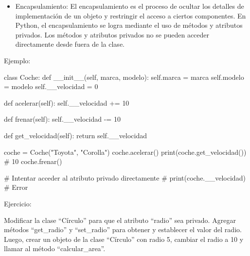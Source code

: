 \documentclass[
  a4paper,
  DIV=11,
  numbers=noendperiod,
  onepage,
  openany]{scrreprt}
\newenvironment{Shaded}{\begin{snugshade}}{\end{snugshade}}
\newcommand{\BuiltInTok}[1]{\textcolor[rgb]{0.00,0.23,0.31}{#1}}
\newcommand{\CommentTok}[1]{\textcolor[rgb]{0.37,0.37,0.37}{#1}}
\newcommand{\ControlFlowTok}[1]{\textcolor[rgb]{0.00,0.23,0.31}{#1}}
\newcommand{\DecValTok}[1]{\textcolor[rgb]{0.68,0.00,0.00}{#1}}
\newcommand{\FunctionTok}[1]{\textcolor[rgb]{0.28,0.35,0.67}{#1}}
\newcommand{\KeywordTok}[1]{\textcolor[rgb]{0.00,0.23,0.31}{#1}}
\newcommand{\NormalTok}[1]{\textcolor[rgb]{0.00,0.23,0.31}{#1}}
\newcommand{\OperatorTok}[1]{\textcolor[rgb]{0.37,0.37,0.37}{#1}}
\newcommand{\StringTok}[1]{\textcolor[rgb]{0.13,0.47,0.30}{#1}}
\newcommand{\VariableTok}[1]{\textcolor[rgb]{0.07,0.07,0.07}{#1}}
\providecommand{\tightlist}{%
  \setlength{\itemsep}{0pt}\setlength{\parskip}{0pt}}\usepackage{longtable,booktabs,array}
\begin{document}
\begin{itemize}
\tightlist
\item
  Encapsulamiento: El encapsulamiento es el proceso de ocultar los
  detalles de implementación de un objeto y restringir el acceso a
  ciertos componentes. En Python, el encapsulamiento se logra mediante
  el uso de métodos y atributos privados. Los métodos y atributos
  privados no se pueden acceder directamente desde fuera de la clase.
\end{itemize}

Ejemplo:

\begin{Shaded}
\begin{Highlighting}[]
\KeywordTok{class}\NormalTok{ Coche:}
    \KeywordTok{def} \FunctionTok{\_\_init\_\_}\NormalTok{(}\VariableTok{self}\NormalTok{, marca, modelo):}
        \VariableTok{self}\NormalTok{.marca }\OperatorTok{=}\NormalTok{ marca}
        \VariableTok{self}\NormalTok{.modelo }\OperatorTok{=}\NormalTok{ modelo}
        \VariableTok{self}\NormalTok{.\_\_velocidad }\OperatorTok{=} \DecValTok{0}

    \KeywordTok{def}\NormalTok{ acelerar(}\VariableTok{self}\NormalTok{):}
        \VariableTok{self}\NormalTok{.\_\_velocidad }\OperatorTok{+=} \DecValTok{10}

    \KeywordTok{def}\NormalTok{ frenar(}\VariableTok{self}\NormalTok{):}
        \VariableTok{self}\NormalTok{.\_\_velocidad }\OperatorTok{{-}=} \DecValTok{10}

    \KeywordTok{def}\NormalTok{ get\_velocidad(}\VariableTok{self}\NormalTok{):}
        \ControlFlowTok{return} \VariableTok{self}\NormalTok{.\_\_velocidad}

\NormalTok{coche }\OperatorTok{=}\NormalTok{ Coche(}\StringTok{"Toyota"}\NormalTok{, }\StringTok{"Corolla"}\NormalTok{)}
\NormalTok{coche.acelerar()}
\BuiltInTok{print}\NormalTok{(coche.get\_velocidad())  }\CommentTok{\# 10}
\NormalTok{coche.frenar()}

\CommentTok{\# Intentar acceder al atributo privado directamente}
\CommentTok{\# print(coche.\_\_velocidad)  \# Error}
\end{Highlighting}
\end{Shaded}

Ejercicio:

Modificar la clase ``Círculo'' para que el atributo ``radio'' sea
privado. Agregar métodos ``get\_radio'' y ``set\_radio'' para obtener y
establecer el valor del radio. Luego, crear un objeto de la clase
``Círculo'' con radio 5, cambiar el radio a 10 y llamar al método
``calcular\_area''.
\end{document}
